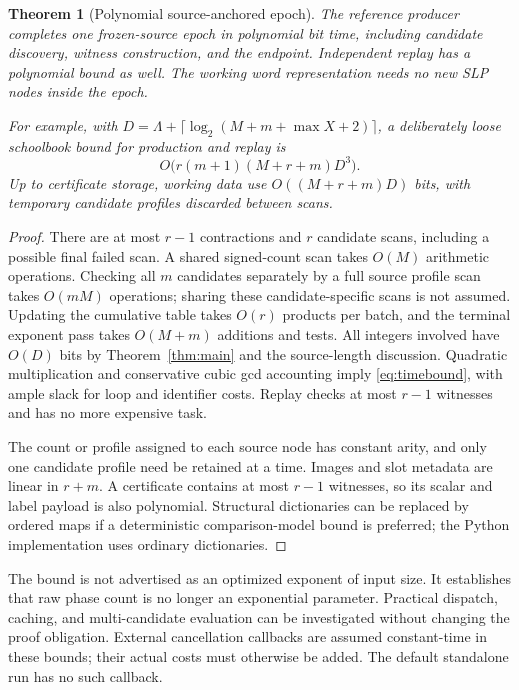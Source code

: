 \documentclass[11pt,letterpaper]{article}
\newtheorem{theorem}{Theorem}[section]
\theoremstyle{definition}
\theoremstyle{remark}\newtheorem{remark}[theorem]{Remark}
\begin{document}
\begin{theorem}[Polynomial source-anchored epoch]
\label{thm:anchored}
The reference producer completes one frozen-source epoch in polynomial bit
time, including candidate discovery, witness construction, and the endpoint.
Independent replay has a polynomial bound as well. The working word
representation needs no new SLP nodes inside the epoch.

For example, with
$D=\Lambda+\lceil\log_2(M+m+\max X+2)\rceil$, a deliberately loose
schoolbook bound for production and replay is
\begin{equation}
 O\bigl(r(m+1)(M+r+m)D^3\bigr).
 \label{eq:timebound}
\end{equation}
Up to certificate storage, working data use
$O((M+r+m)D)$ bits, with temporary candidate profiles discarded between scans.
\end{theorem}
\begin{proof}
There are at most $r-1$ contractions and $r$ candidate scans, including a
possible final failed scan. A shared signed-count scan takes $O(M)$
arithmetic operations. Checking all $m$ candidates separately by a full source
profile scan takes $O(mM)$ operations; sharing these candidate-specific scans
is not assumed. Updating the cumulative table takes $O(r)$ products per
batch, and the terminal exponent pass takes $O(M+m)$ additions and tests.
All integers involved have $O(D)$ bits by Theorem~\ref{thm:main} and the
source-length discussion. Quadratic multiplication and conservative cubic gcd
accounting imply \eqref{eq:timebound}, with ample slack for loop and identifier
costs. Replay checks at most $r-1$ witnesses and has no more expensive task.

The count or profile assigned to each source node has constant arity, and
only one candidate profile need be retained at a time. Images and slot
metadata are linear in $r+m$. A certificate contains at most $r-1$ witnesses,
so its scalar and label payload is also polynomial. Structural dictionaries
can be replaced by ordered maps if a deterministic comparison-model bound is
preferred; the Python implementation uses ordinary dictionaries.
\end{proof}

The bound is not advertised as an optimized exponent of input size. It
establishes that raw phase count is no longer an exponential parameter.
Practical dispatch, caching, and multi-candidate evaluation can be investigated
without changing the proof obligation. External cancellation callbacks are
assumed constant-time in these bounds; their actual costs must otherwise be
added. The default standalone run has no such callback.
\end{document}
